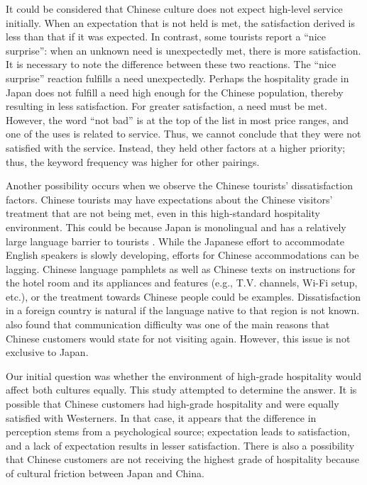 \documentclass[smallextended,natbib]{svjour3}       %
\begin{document}
    It could be considered that Chinese culture does not expect high-level service initially. When an expectation that is not held is met, the satisfaction derived is less than that if it was expected. In contrast, some tourists report a ``nice surprise'': when an unknown need is unexpectedly met, there is more satisfaction. It is necessary to note the difference between these two reactions. The ``nice surprise'' reaction fulfills a need unexpectedly. Perhaps the hospitality grade in Japan does not fulfill a need high enough for the Chinese population, thereby resulting in less satisfaction. For greater satisfaction, a need must be met. However, the word ``not bad'' is at the top of the list in most price ranges, and one of the uses is related to service. Thus, we cannot conclude that they were not satisfied with the service. Instead, they held other factors at a higher priority; thus, the keyword frequency was higher for other pairings.

    Another possibility occurs when we observe the Chinese tourists’ dissatisfaction factors. Chinese tourists may have expectations about the Chinese visitors' treatment that are not being met, even in this high-standard hospitality environment. This could be because Japan is monolingual and has a relatively large language barrier to tourists \cite[][]{heinrich2012making,coulmas2002japan}. While the Japanese effort to accommodate English speakers is slowly developing, efforts for Chinese accommodations can be lagging. Chinese language pamphlets as well as Chinese texts on instructions for the hotel room and its appliances and features (e.g., T.V. channels, Wi-Fi setup, etc.), or the treatment towards Chinese people could be examples. Dissatisfaction in a foreign country is natural if the language native to that region is not known. \cite{ryan2001} also found that communication difficulty was one of the main reasons that Chinese customers would state for not visiting again. However, this issue is not exclusive to Japan.

    Our initial question was whether the environment of high-grade hospitality would affect both cultures equally. This study attempted to determine the answer. It is possible that Chinese customers had high-grade hospitality and were equally satisfied with Westerners. In that case, it appears that the difference in perception stems from a psychological source; expectation leads to satisfaction, and a lack of expectation results in lesser satisfaction. There is also a possibility that Chinese customers are not receiving the highest grade of hospitality because of cultural friction between Japan and China.
\end{document}
